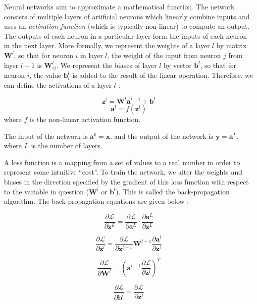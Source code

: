Neural networks aim to approximate a mathematical function. The network consists of multiple layers of artificial neurons which linearly combine inputs and uses an \textit{activation function} (which is typically non-linear) to compute an output. The outputs of each neuron in a particular layer form the inputs of each neuron in the next layer. More formally, we represent the weights of a layer $l$ by matrix $\boldsymbol{W}^l$, so that for neuron $i$ in layer $l$, the weight of the input from neuron $j$ from layer $l-1$ is $\boldsymbol{W}^l_{ij}$. We represent the biases of layer $l$ by vector $\boldsymbol{b}^l$, so that for neuron $i$, the value $\boldsymbol{b}^l_i$ is added to the result of the linear operation. Therefore, we can define the activations of a layer $l$ \cite{csmlnotes}:

\[
\boldsymbol{z}^l = \boldsymbol{W}^l \boldsymbol{a}^{l-1} + \boldsymbol{b}^l
\]
\[
\boldsymbol{a}^{l} = f(\boldsymbol{z}^{l})
\]
where $f$ is the non-linear activation function.

The input of the network is $\boldsymbol{a}^0 = \boldsymbol{x}$, and the output of the network is $\boldsymbol{y} = \boldsymbol{a}^L$, where $L$ is the number of layers.

A loss function is a mapping from a set of values to a real number in order to represent some intuitive ``cost''. To train the network, we alter the weights and biases in the direction specified by the gradient of this loss function with respect to the variable in question ($\boldsymbol{W}^l$ or $\boldsymbol{b}^l$). This is called the back-propagation algorithm. The back-propagation equations are given below \cite{csmlnotes}:

\[\frac{\partial \mathcal{L}}{\partial \boldsymbol{z}^L} =\frac{\partial \mathcal{L}}{\partial \boldsymbol{a}^L} \cdot \frac{\partial \boldsymbol{a}^L}{\partial \boldsymbol{z}^L}\]

\[\frac{\partial \mathcal{L}}{\partial \boldsymbol{z}^l} = \frac{\partial \mathcal{L}}{\partial \boldsymbol{z}^{l+1}} \boldsymbol{W}^{l+1} \frac{\partial \boldsymbol{a}^l}{\partial \boldsymbol{z}^{l}}\]

\[\frac{\partial \mathcal{L}}{\partial \boldsymbol{W}^l} = (\boldsymbol{a}^{l-1} \frac{\partial \mathcal{L}}{\partial \boldsymbol{z}^l} )^T\]

\[\frac{\partial \mathcal{L}}{\partial \boldsymbol{b}^l} =\frac{\partial \mathcal{L}}{\partial \boldsymbol{z}^l}\]



